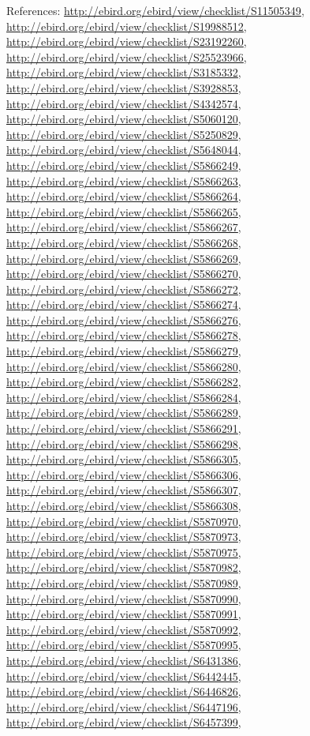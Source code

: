 \documentclass[9pt, article]{memoir}
\begin{document}
\begin{multicols}{2}
\vspace{6pt}References: 
\url{http://ebird.org/ebird/view/checklist/S11505349}, 
\url{http://ebird.org/ebird/view/checklist/S19988512}, 
\url{http://ebird.org/ebird/view/checklist/S23192260}, 
\url{http://ebird.org/ebird/view/checklist/S25523966}, 
\url{http://ebird.org/ebird/view/checklist/S3185332}, 
\url{http://ebird.org/ebird/view/checklist/S3928853}, 
\url{http://ebird.org/ebird/view/checklist/S4342574}, 
\url{http://ebird.org/ebird/view/checklist/S5060120}, 
\url{http://ebird.org/ebird/view/checklist/S5250829}, 
\url{http://ebird.org/ebird/view/checklist/S5648044}, 
\url{http://ebird.org/ebird/view/checklist/S5866249}, 
\url{http://ebird.org/ebird/view/checklist/S5866263}, 
\url{http://ebird.org/ebird/view/checklist/S5866264}, 
\url{http://ebird.org/ebird/view/checklist/S5866265}, 
\url{http://ebird.org/ebird/view/checklist/S5866267}, 
\url{http://ebird.org/ebird/view/checklist/S5866268}, 
\url{http://ebird.org/ebird/view/checklist/S5866269}, 
\url{http://ebird.org/ebird/view/checklist/S5866270}, 
\url{http://ebird.org/ebird/view/checklist/S5866272}, 
\url{http://ebird.org/ebird/view/checklist/S5866274}, 
\url{http://ebird.org/ebird/view/checklist/S5866276}, 
\url{http://ebird.org/ebird/view/checklist/S5866278}, 
\url{http://ebird.org/ebird/view/checklist/S5866279}, 
\url{http://ebird.org/ebird/view/checklist/S5866280}, 
\url{http://ebird.org/ebird/view/checklist/S5866282}, 
\url{http://ebird.org/ebird/view/checklist/S5866284}, 
\url{http://ebird.org/ebird/view/checklist/S5866289}, 
\url{http://ebird.org/ebird/view/checklist/S5866291}, 
\url{http://ebird.org/ebird/view/checklist/S5866298}, 
\url{http://ebird.org/ebird/view/checklist/S5866305}, 
\url{http://ebird.org/ebird/view/checklist/S5866306}, 
\url{http://ebird.org/ebird/view/checklist/S5866307}, 
\url{http://ebird.org/ebird/view/checklist/S5866308}, 
\url{http://ebird.org/ebird/view/checklist/S5870970}, 
\url{http://ebird.org/ebird/view/checklist/S5870973}, 
\url{http://ebird.org/ebird/view/checklist/S5870975}, 
\url{http://ebird.org/ebird/view/checklist/S5870982}, 
\url{http://ebird.org/ebird/view/checklist/S5870989}, 
\url{http://ebird.org/ebird/view/checklist/S5870990}, 
\url{http://ebird.org/ebird/view/checklist/S5870991}, 
\url{http://ebird.org/ebird/view/checklist/S5870992}, 
\url{http://ebird.org/ebird/view/checklist/S5870995}, 
\url{http://ebird.org/ebird/view/checklist/S6431386}, 
\url{http://ebird.org/ebird/view/checklist/S6442445}, 
\url{http://ebird.org/ebird/view/checklist/S6446826}, 
\url{http://ebird.org/ebird/view/checklist/S6447196}, 
\url{http://ebird.org/ebird/view/checklist/S6457399}, 

\end{multicols}
\end{document}
